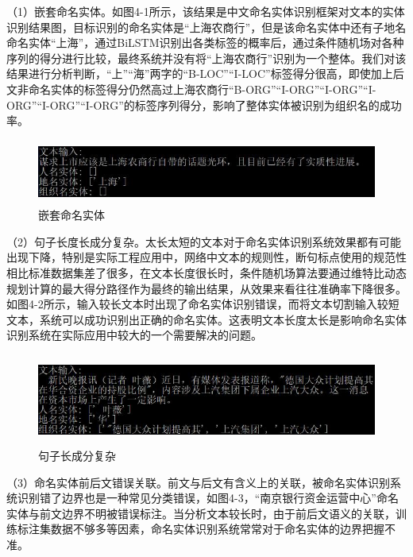 \documentclass[winfonts,master,oneside,nobackinfo]{njuthesis}
\begin{document}
（1）嵌套命名实体。如图4-1所示，该结果是中文命名实体识别框架对文本的实体识别结果图，目标识别的命名实体是“上海农商行”，但是该命名实体中还有子地名命名实体“上海”，通过BiLSTM识别出各类标签的概率后，通过条件随机场对各种序列的得分进行比较，最终系统并没有将“上海农商行”识别为一个整体。我们对该结果进行分析判断，“上”“海”两字的“B-LOC”“I-LOC”标签得分很高，即使加上后文非命名实体的标签得分仍然高过上海农商行“B-ORG”“I-ORG”“I-ORG”“I-ORG”“I-ORG”“I-ORG”的标签序列得分，影响了整体实体被识别为组织名的成功率。

\begin{figure}[H]
\centering
\begin{minipage}[t]{\textwidth}
\includegraphics[width=1\textwidth,height=2.14cm]{./figure/嵌套命名实体.jpg}
\caption{嵌套命名实体}
\label{lab:1}
\end{minipage}
\end{figure}

（2）句子长度长成分复杂。太长太短的文本对于命名实体识别系统效果都有可能出现下降，特别是实际工程应用中，网络中文本的规则性，断句标点使用的规范性相比标准数据集差了很多，在文本长度很长时，条件随机场算法要通过维特比动态规划计算的最大得分路径作为最终的输出结果，从效果来看往往准确率下降很多。如图4-2所示，输入较长文本时出现了命名实体识别错误，而将文本切割输入较短文本，系统可以成功识别出正确的命名实体。这表明文本长度太长是影响命名实体识别系统在实际应用中较大的一个需要解决的问题。


\begin{figure}[H]
\centering
\begin{minipage}[t]{\textwidth}
\includegraphics[width=1\textwidth,height=3cm]{./figure/句子长成分复杂.jpg}
\caption{句子长成分复杂}
\label{lab:1}
\end{minipage}
\end{figure}

（3）命名实体前后文错误关联。前文与后文有含义上的关联，被命名实体识别系统识别错了边界也是一种常见分类错误，如图4-3，“南京银行资金运营中心”命名实体与前文边界不明被错误标注。当分析文本较长时，由于前后文语义的关联，训练标注集数据不够多等因素，命名实体识别系统常常对于命名实体的边界把握不准。
\end{document}
